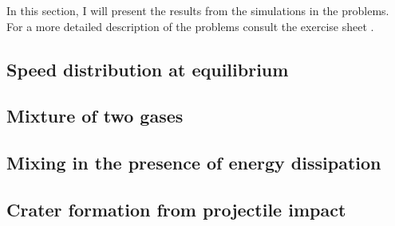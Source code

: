 In this section, I will present the results from the simulations in the problems. For a more detailed description of the problems consult the exercise sheet \cite{sheet}.

\subsection{Speed distribution at equilibrium}\label{sec:eq}



\subsection{Mixture of two gases}\label{sec:mix1}



\subsection{Mixing in the presence of energy dissipation}\label{sec:mix2}



\subsection{Crater formation from projectile impact}\label{sec:crater}






